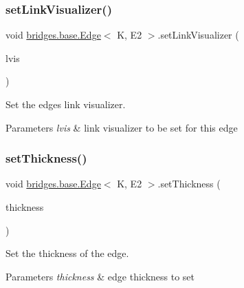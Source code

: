 \subsubsection{\texorpdfstring{set\+Link\+Visualizer()}{setLinkVisualizer()}}
{\footnotesize\ttfamily void \hyperlink{classbridges_1_1base_1_1_edge}{bridges.\+base.\+Edge}$<$ K, E2 $>$.set\+Link\+Visualizer (\begin{DoxyParamCaption}\item[{\hyperlink{classbridges_1_1base_1_1_link_visualizer}{Link\+Visualizer}}]{lvis }\end{DoxyParamCaption})}



Set the edge\textquotesingle{}s link visualizer. 


\begin{DoxyParams}{Parameters}
{\em lvis} & link visualizer to be set for this edge \\
\hline
\end{DoxyParams}
\mbox{\label{classbridges_1_1base_1_1_edge_ae8d87539f03f04479e5f5710ea9bf260}} 
\subsubsection{\texorpdfstring{set\+Thickness()}{setThickness()}}
{\footnotesize\ttfamily void \hyperlink{classbridges_1_1base_1_1_edge}{bridges.\+base.\+Edge}$<$ K, E2 $>$.set\+Thickness (\begin{DoxyParamCaption}\item[{double}]{thickness }\end{DoxyParamCaption})}



Set the thickness of the edge. 


\begin{DoxyParams}{Parameters}
{\em thickness} & edge thickness to set \\
\hline
\end{DoxyParams}
\mbox{\label{classbridges_1_1base_1_1_edge_a5e574139711be3f96c42da02a2702aea}} 
